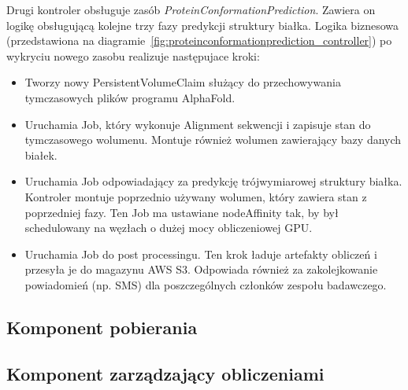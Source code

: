 Drugi kontroler obsługuje zasób \textit{ProteinConformationPrediction}.
Zawiera on logikę obsługującą kolejne trzy fazy predykcji struktury białka.
Logika biznesowa (przedstawiona na diagramie~\ref{fig:proteinconformationprediction_controller}) po wykryciu nowego zasobu realizuje następujace kroki:
\begin{itemize}
    \item Tworzy nowy PersistentVolumeClaim służący do przechowywania tymczasowych plików programu AlphaFold.
    \item Uruchamia Job, który wykonuje Alignment sekwencji i zapisuje stan do tymczasowego wolumenu.
    Montuje również wolumen zawierający bazy danych białek.
    \item Uruchamia Job odpowiadający za predykcję trójwymiarowej struktury białka.
    Kontroler montuje poprzednio używany wolumen, który zawiera stan z poprzedniej fazy.
    Ten Job ma ustawiane nodeAffinity tak, by był schedulowany na węzłach o dużej mocy obliczeniowej GPU.
    \item Uruchamia Job do post processingu.
    Ten krok ładuje artefakty obliczeń i przesyła je do magazynu AWS S3. Odpowiada również za zakolejkowanie powiadomień (np.
    SMS) dla poszczególnych członków zespołu badawczego.
\end{itemize}

\subsection{Komponent pobierania}\label{subsec:component-downloader}

\subsection{Komponent zarządzający obliczeniami}\label{subsec:component-manager}